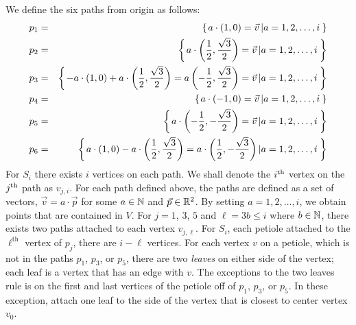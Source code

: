 We define the six paths from origin as follows:      
\begin{eqnarray*}
p_1 &=& {\left\lbrace \left. a\cdot\left( 1,0 \right) = \vec{v} \left\vert a = 1,2,\dots, i \right.\right.\right\rbrace }\\
p_2 &=& {\left\lbrace \left. a\cdot\left( \frac{1}{2},\frac{\sqrt{3}}{2} \right) = \vec{v} \left\vert a = 1,2,\dots, i \right.\right.\right\rbrace }\\
p_3 &=& {\left\lbrace \left. -a\cdot \left( 1,0 \right) + a \cdot \left( \frac{1}{2},\frac{\sqrt{3}}{2} \right) = a\left( -\frac{1}{2},\frac{\sqrt{3}}{2} \right) = \vec{v} \left\vert a = 1,2,\dots, i \right.\right.\right\rbrace }\\
p_4 &=& {\left\lbrace \left. a \cdot \left( -1,0 \right) = \vec{v} \left\vert a = 1,2,\dots, i \right.\right.\right\rbrace }\\
p_5 &=& {\left\lbrace \left. a \cdot \left( -\frac{1}{2},-\frac{\sqrt{3}}{2} \right)  = \vec{v} \left\vert a = 1,2,\dots, i \right.\right.\right\rbrace }\\
p_6 &=& {\left\lbrace \left.  a\cdot \left( 1,0 \right) - a \cdot \left( \frac{1}{2},\frac{\sqrt{3}}{2} \right)= a \cdot \left( \frac{1}{2}, -\frac{\sqrt{3}}{2} \right) \left\vert a = 1,2,\dots, i \right.\right.\right\rbrace }
\end{eqnarray*}
For $S_i$ there exists $i$ vertices on each path.  We shall denote the $i^\text{th}$ vertex on the $j^\text{th}$ path as $v_{j,i}$.  
For each path defined above, the paths are defined as a set of vectors, $\vec{v} = a \cdot \vec{p}$  for some $a \in {\mathbb{N}}$ and $\vec{p} \in {\mathbb{R}}^2$.  
By setting $a = 1,2,\dots, i$, we obtain points that are contained in $V$.  
For $j = 1$, $3$, $5$ and $\ell = 3 b \leq i$ where $b \in {\mathbb{N}}$,  there exists two paths attached to each vertex $v_{j,\ell}$.  
For $S_i$, each petiole attached to the $\ell^\text{th}$ vertex of $p_j$, there are $i-\ell$ vertices. 
For each vertex $v$ on a petiole, which is not in the paths $p_1$, $p_3$, or $p_5$, there are two \textit{leaves} on either side of the vertex; each leaf is a vertex that has an edge with $v$.  
The exceptions to the two leaves rule is on the first and last vertices of the petiole off of $p_1$, $p_3$, or $p_5$.  
In these exception, attach one leaf to the side of the vertex that is closest to center vertex $v_0$.

